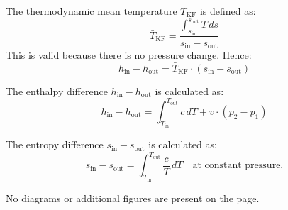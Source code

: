The thermodynamic mean temperature \( \bar{T}_{\text{KF}} \) is defined as:  
\[
\bar{T}_{\text{KF}} = \frac{\int_{s_{\text{in}}}^{s_{\text{out}}} T \, ds}{s_{\text{in}} - s_{\text{out}}}
\]  
This is valid because there is no pressure change. Hence:  
\[
h_{\text{in}} - h_{\text{out}} = \bar{T}_{\text{KF}} \cdot (s_{\text{in}} - s_{\text{out}})
\]  

The enthalpy difference \( h_{\text{in}} - h_{\text{out}} \) is calculated as:  
\[
h_{\text{in}} - h_{\text{out}} = \int_{T_{\text{in}}}^{T_{\text{out}}} c \, dT + v \cdot (p_2 - p_1)
\]  

The entropy difference \( s_{\text{in}} - s_{\text{out}} \) is calculated as:  
\[
s_{\text{in}} - s_{\text{out}} = \int_{T_{\text{in}}}^{T_{\text{out}}} \frac{c}{T} \, dT \quad \text{at constant pressure.}
\]  

No diagrams or additional figures are present on the page.